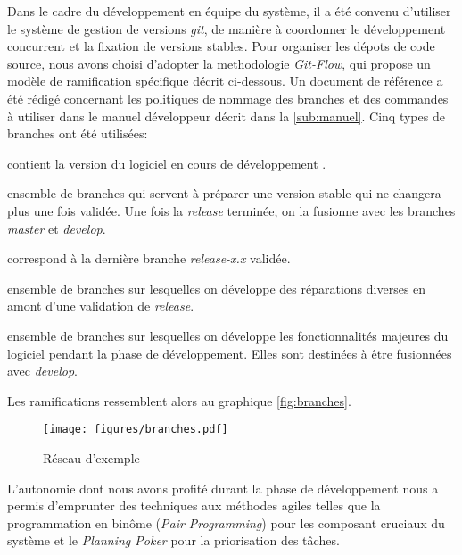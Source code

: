 			Dans le cadre du développement en équipe du système, il a été convenu d'utiliser le système de gestion de versions \emph{git}, de manière à coordonner le développement concurrent et la fixation de versions stables. Pour organiser les dépots de code source, nous avons choisi d'adopter la methodologie \emph{Git-Flow}, qui propose un modèle de ramification spécifique décrit ci-dessous. Un document de référence a été rédigé concernant les politiques de nommage des branches et des commandes à utiliser dans le manuel développeur décrit dans la \autoref{sub:manuel}.
			Cinq types de branches ont été utilisées:
			\begin{description}[noitemsep, before={\setcounter{descriptcount}{0}},font=\bfseries\stepcounter{descriptcount}\thedescriptcount.~]
				\item[\emph{develop}:] contient la version du logiciel en cours de développement .
				\item[\emph{release-<version>}:] ensemble de branches qui servent à préparer une version stable qui ne changera plus une fois validée. Une fois la \emph{release} terminée, on la fusionne avec les branches \emph{master} et \emph{develop}.
				\item[\emph{master}:] correspond à la dernière branche \emph{release-x.x} validée.
				\item[\emph{hotfix-<raison>}:] ensemble de branches sur lesquelles on développe des réparations diverses en amont d'une validation de \emph{release}.
				\item[\emph{feature-<nom>}:] ensemble de branches sur lesquelles on développe les fonctionnalités majeures du logiciel pendant la phase de développement. Elles sont destinées à être fusionnées avec \emph{develop}.
			\end{description}
			Les ramifications ressemblent alors au graphique \autoref{fig:branches}.
			\begin{figure}[h]
			{
				\centering
				\texttt{[image: figures/branches.pdf]}
				\caption{Réseau d'exemple}
				\label{fig:branches}
			}
			\end{figure}
			
			\par
			L'autonomie dont nous avons profité durant la phase de développement nous a permis d'emprunter des techniques aux méthodes agiles telles que la programmation en binôme (\emph{Pair Programming}) pour les composant cruciaux du système et le \emph{Planning Poker} pour la priorisation des tâches.
			
